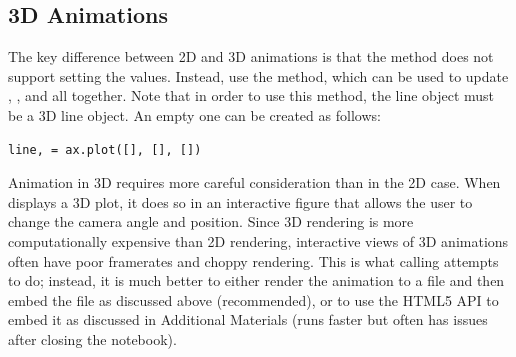 \subsection*{3D Animations}
The key difference between 2D and 3D animations is that the  method does not support setting the  values.
Instead, use the  method, which can be used to update , , and  all together.
Note that in order to use this method, the line object must be a 3D line object.
An empty one can be created as follows:
\begin{lstlisting}
line, = ax.plot([], [], [])
\end{lstlisting}

Animation in 3D requires more careful consideration than in the 2D case.
When  displays a 3D plot, it does so in an interactive figure that allows the user to change the camera angle and position.
Since 3D rendering is more computationally expensive than 2D rendering, interactive views of 3D animations often have poor framerates and choppy rendering.
This is what calling  attempts to do; instead, it is much better to either render the animation to a file and then embed the file as discussed above (recommended), or to use the HTML5 API to embed it as discussed in Additional Materials (runs faster but often has issues after closing the notebook).

